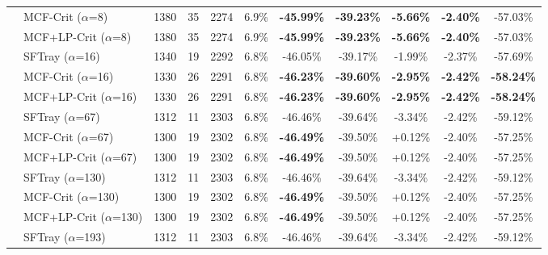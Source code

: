 \begin{table}[t]
{\begin{tabular}{ll|cccc|ccc|cc}
 & MCF-Crit ($\alpha$=8) & 1380 & 35 & 2274 & 6.9\% & \textbf{-45.99\%} & \textbf{-39.23\%} & \textbf{-5.66\%} & \textbf{-2.40\%} & -57.03\% \\

 & MCF+LP-Crit ($\alpha$=8) & 1380 & 35 & 2274 & 6.9\% & \textbf{-45.99\%} & \textbf{-39.23\%} & \textbf{-5.66\%} & \textbf{-2.40\%} & -57.03\% \\

\addlinespace[0.5em]

 & SFTray ($\alpha$=16) & 1340 & 19 & 2292 & 6.8\% & -46.05\% & -39.17\% & -1.99\% & -2.37\% & -57.69\% \\

 & MCF-Crit ($\alpha$=16) & 1330 & 26 & 2291 & 6.8\% & \textbf{-46.23\%} & \textbf{-39.60\%} & \textbf{-2.95\%} & \textbf{-2.42\%} & \textbf{-58.24\%} \\

 & MCF+LP-Crit ($\alpha$=16) & 1330 & 26 & 2291 & 6.8\% & \textbf{-46.23\%} & \textbf{-39.60\%} & \textbf{-2.95\%} & \textbf{-2.42\%} & \textbf{-58.24\%} \\

\addlinespace[0.5em]

 & SFTray ($\alpha$=67) & 1312 & 11 & 2303 & 6.8\% & -46.46\% & -39.64\% & -3.34\% & -2.42\% & -59.12\% \\

 & MCF-Crit ($\alpha$=67) & 1300 & 19 & 2302 & 6.8\% & \textbf{-46.49\%} & -39.50\% & +0.12\% & -2.40\% & -57.25\% \\

 & MCF+LP-Crit ($\alpha$=67) & 1300 & 19 & 2302 & 6.8\% & \textbf{-46.49\%} & -39.50\% & +0.12\% & -2.40\% & -57.25\% \\

\addlinespace[0.5em]

 & SFTray ($\alpha$=130) & 1312 & 11 & 2303 & 6.8\% & -46.46\% & -39.64\% & -3.34\% & -2.42\% & -59.12\% \\

 & MCF-Crit ($\alpha$=130) & 1300 & 19 & 2302 & 6.8\% & \textbf{-46.49\%} & -39.50\% & +0.12\% & -2.40\% & -57.25\% \\

 & MCF+LP-Crit ($\alpha$=130) & 1300 & 19 & 2302 & 6.8\% & \textbf{-46.49\%} & -39.50\% & +0.12\% & -2.40\% & -57.25\% \\

\addlinespace[0.5em]

 & SFTray ($\alpha$=193) & 1312 & 11 & 2303 & 6.8\% & -46.46\% & -39.64\% & -3.34\% & -2.42\% & -59.12\% \\


\end{tabular}}
\end{table}
